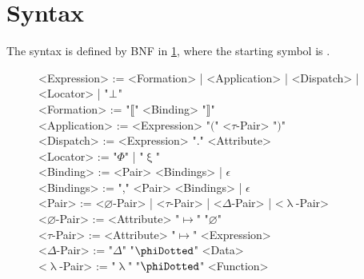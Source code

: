 
\section{Syntax}\label{sec:syntax}

The syntax is defined by BNF in \cref{fig:ebnf},
  where the starting symbol is .

\begin{figure}
\begin{mdframed}
\raggedright
\begin{ebnf}[8em]
<Expression> := <Formation> | <Application> | <Dispatch> | <Locator> | "\(\bot\)" \\
<Formation> := "\(\llbracket\)" <Binding> "\(\rrbracket\)" \\
<Application> := <Expression> "\(\lparen\)" <\(\tau\)-Pair> "\(\rparen\)" \\
<Dispatch> := <Expression> "." <Attribute> \\
<Locator> := "\(\Phi\)" | "\(\upxi\)" \\
<Binding> := <Pair> <Bindings> | \(\epsilon\) \\
<Bindings> := "," <Pair> <Bindings> | \(\epsilon\) \\
<Pair> := <\(\varnothing\)-Pair> | <\(\tau\)-Pair> | <\(\Delta\)-Pair> | <\(\uplambda\)-Pair> \\
<\(\varnothing\)-Pair> := <Attribute> "\(\mapsto\)" "\(\varnothing\)" \\
<\(\tau\)-Pair> := <Attribute> "\(\mapsto\)" <Expression> \\
<\(\Delta\)-Pair> := "\(\Delta\)" "\(\phiDotted\)" <Data> \\
<\(\uplambda\)-Pair> := "\(\uplambda\)" "\(\phiDotted\)" <Function> \\
\end{ebnf}
\end{mdframed}
\label{fig:ebnf}
\end{figure}

